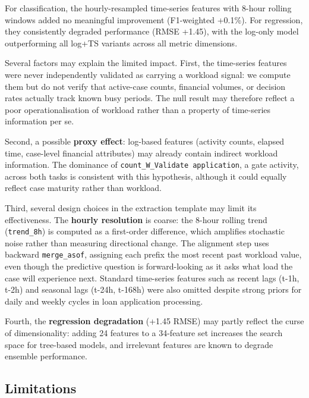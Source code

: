 \documentclass[runningheads]{llncs}
\begin{document}
For classification, the hourly-resampled time-series features with 8-hour
rolling windows added no meaningful improvement (F1-weighted +0.1\%).
For regression, they consistently degraded performance (RMSE +1.45),
with the log-only model outperforming all log+TS variants across all
metric dimensions.

Several factors may explain the limited impact. First, the time-series
features were never independently validated as carrying a workload signal:
we compute them but do not verify that active-case counts, financial
volumes, or decision rates actually track known busy periods. The null
result may therefore reflect a poor operationalisation of workload rather
than a property of time-series information per se.

Second, a possible \textbf{proxy effect}: log-based features (activity
counts, elapsed time, case-level financial attributes) may already contain
indirect workload information. The dominance of
\texttt{count\_W\_Validate application}, a gate activity, across both tasks
is consistent with this hypothesis, although it could equally reflect
case maturity rather than workload.

Third, several design choices in the extraction template may limit its
effectiveness. The \textbf{hourly resolution} is coarse: the 8-hour
rolling trend (\texttt{trend\_8h}) is computed as a first-order
difference, which amplifies stochastic noise rather than measuring
directional change. The alignment step uses backward
\texttt{merge\_asof}, assigning each prefix the most recent past
workload value, even though the predictive question is forward-looking
as it asks what load the case will experience next. Standard time-series features such
as recent lags (t-1h, t-2h) and seasonal lags (t-24h, t-168h) were
also omitted despite strong priors for daily and weekly cycles in
loan application processing.

Fourth, the \textbf{regression degradation} (+1.45 RMSE) may partly
reflect the curse of dimensionality: adding 24 features to a 34-feature
set increases the search space for tree-based models, and irrelevant
features are known to degrade ensemble performance.

\subsection{Limitations}
\label{sec:discussion-limits}
\end{document}
